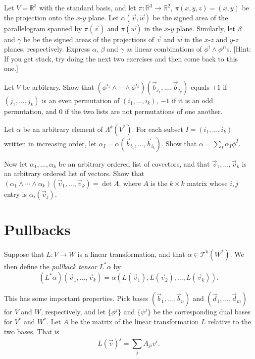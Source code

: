 \documentclass[12pt]{amsbook}
\newcommand{\be}{\begin{equation}}
\newcommand{\ee}{\end{equation}}
\newcommand{\T}{{\mathcal T}}
\newcommand{\R}{{\mathbb R}}
\theoremstyle{definition}
\begin{document}
\smallskip

 Let $V=\R^3$ with the standard basis, and let $\pi:
\R^3 \to \R^2$, $\pi(x,y,z)=(x,y)$ be the projection onto the $x$-$y$ plane.
Let $\alpha(\vec v, \vec w)$ be the signed area of the parallelogram spanned
by $\pi(\vec v)$ and  $\pi(\vec w)$ in the $x$-$y$ plane. Similarly,
let $\beta$ and $\gamma$ be
be the signed areas of the projections of $\vec v$ and $\vec w$ in the
$x$-$z$ and $y$-$z$ planes, respectively. Express $\alpha$, $\beta$ and 
$\gamma$ as linear combinations of $\phi^i \wedge \phi^j$'s. [Hint: If you
get stuck, try doing the next two exercises and then come back to this one.]

\smallskip

 Let $V$ be arbitrary.  Show that
$(\phi^{i_1}\wedge \cdots \wedge \phi^{i_k})(\vec b_{j_1},\ldots,\vec
b_{j_k})$ equals $+1$ if $(j_1,\ldots,j_k)$ is an even permutation of
$(i_1,\ldots,i_k)$, $-1$ if it is an odd permutation, and 0 if the two 
lists are not permutations of one another. 

\smallskip 

 Let $\alpha$ be an arbitrary element of 
$\Lambda^k(V^*)$. For each subset $I=(i_1,\ldots,i_k)$ written in increasing
order, let $\alpha_I=\alpha(\vec b_{i_1},\ldots,\vec b_{i_k})$. Show that 
$\alpha = \sum_I \alpha_I \phi^I$. 

\smallskip

 Now let $\alpha_1, \ldots, \alpha_k$ be an
arbitrary ordered list of covectors, and that $\vec v_1, \ldots, \vec v_k$
is an arbitrary ordered list of vectors. Show that 
$(\alpha_1 \wedge \cdots \wedge \alpha_k)(\vec v_1,\ldots,\vec v_k) = 
\det A$, where $A$ is the $k\times k$ matrix whose $i,j$ entry is 
$\alpha_i(\vec v_j)$.  

\section{Pullbacks}

Suppose that $L: V \to W$ is a linear transformation, and that 
$\alpha \in \T^k(W^*)$. We then define the {\em pullback tensor} $L^*\alpha$
by
\be (L^*\alpha)(\vec v_1, \ldots, \vec v_k) = 
\alpha(L(\vec v_1), L(\vec v_2), \ldots, L(\vec v_k)). \ee

This has some important properties. Pick bases $(\vec b_1, \ldots, \vec b_n)$
and $(\vec d_1,\ldots, \vec d_m)$ for $V$ and $W$, respectively, and let 
$\{\phi^j\}$ and $\{\psi^j\}$ be the corresponding dual bases for $V^*$ and 
$W^*$. Let $A$ be the matrix of the linear transformation $L$ relative to
the two bases. That is 
$$ L(\vec v)^j = \sum_j A_{ji} v^i.$$
\end{document}

